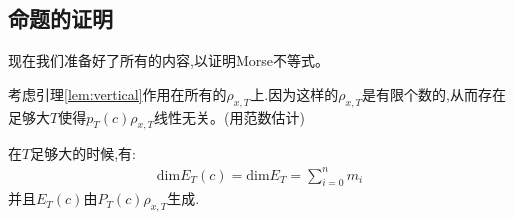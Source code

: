 \subsection{命题的证明}
现在我们准备好了所有的内容,以证明Morse不等式。

考虑引理\ref{lem:vertical}作用在所有的$\rho_{x,T}$上.因为这样的$\rho_{x,T}$是有限个数的,从而存在足够大$T$使得$p_T(c)\rho_{x,T}$线性无关。(用范数估计)

\begin{proposition}
	在$T$足够大的时候,有:
	\begin{align}
\mathrm{dim}E_T(c)=\mathrm{dim}E_T=\sum_{i=0}^n m_i
	\end{align}
	并且$E_T(c)$由$P_T(c)\rho_{x,T}$生成.
\end{proposition}

\ifx\allfiles\undefined
	
	
	
	
	\else
	\fi